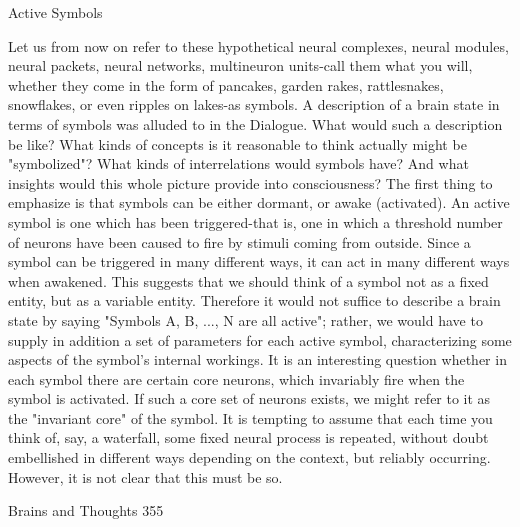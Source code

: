                                       Active Symbols

  Let us from now on refer to these hypothetical neural complexes, neural modules,
neural packets, neural networks, multineuron units-call them what you will, whether they
come in the form of pancakes, garden rakes, rattlesnakes, snowflakes, or even ripples on
lakes-as symbols. A description of a brain state in terms of symbols was alluded to in the
Dialogue. What would such a description be like? What kinds of concepts is it reasonable
to think actually might be "symbolized"? What kinds of interrelations would symbols
have? And what insights would this whole picture provide into consciousness?
  The first thing to emphasize is that symbols can be either dormant, or awake (activated).
An active symbol is one which has been triggered-that is, one in which a threshold
number of neurons have been caused to fire by stimuli coming from outside. Since a
symbol can be triggered in many different ways, it can act in many different ways when
awakened. This suggests that we should think of a symbol not as a fixed entity, but as a
variable entity. Therefore it would not suffice to describe a brain state by saying
"Symbols A, B, ..., N are all active"; rather, we would have to supply in addition a set of
parameters for each active symbol, characterizing some aspects of the symbol's internal
workings. It is an interesting question whether in each symbol there are certain core
neurons, which invariably fire when the symbol is activated. If such a core set of neurons
exists, we might refer to it as the "invariant core" of the symbol. It is tempting to assume
that each time you think of, say, a waterfall, some fixed neural process is repeated,
without doubt embellished in different ways depending on the context, but reliably
occurring. However, it is not clear that this must be so.




Brains and Thoughts                                                                     355

